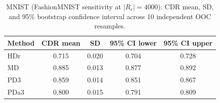 \begin{table}[htbp]
\centering
\caption{MNIST (FashionMNIST sensitivity at $|R_c|=4000$):
CDR mean, SD, and 95\% bootstrap confidence interval
across 10 independent OOC resamples.}
\label{tab:mnist-sensitivity-fashion}
\small
{}
\begin{tabular}{l
  S[table-format=1.3] S[table-format=1.3]
  S[table-format=1.3] S[table-format=1.3]}
\toprule
Method & {CDR mean} & {SD}
  & {95\% CI lower} & {95\% CI upper} \\
\midrule
  HDr & 0.715 & 0.020 & 0.704 & 0.728 \\
  MD & 0.885 & 0.013 & 0.877 & 0.892 \\
  PD3 & 0.859 & 0.014 & 0.851 & 0.867 \\
  PDa3 & 0.800 & 0.015 & 0.791 & 0.809 \\
\bottomrule
\end{tabular}
\end{table}
